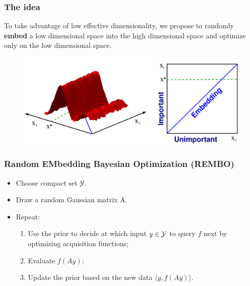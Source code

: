 \documentclass[grey]{beamer}
\begin{document}
 \begin{frame}
  \frametitle{The idea}
  To take advantage of low effective dimensionality, we propose to 
  randomly {\bf \textcolor{myColor}{embed}} 
  a low dimensional space into the high dimensional space and optimize
  only on the low dimensional space.
  \begin{figure}[t]
   \includegraphics[width = 0.9\columnwidth]
   {../paper/figures/2to1embedding}
   \label{fig:ESSL_BLR}
  \end{figure}
 \end{frame}
 
 \begin{frame}
  \frametitle{Random EMbedding Bayesian Optimization (REMBO)}
  \begin{itemize}
   \item Choose compact set {\bf \textcolor{myColor}{$\mathcal{Y}$}}.
   \item Draw a random Gaussian matrix A.
   \item Repeat:
   \begin{enumerate}
    \item Use the prior to decide at which input $y \in \cal Y$ to query $f$ next
    by optimizing acquisition functions;
    \item Evaluate {\bf \textcolor{myColor}{$f(Ay)$}};
    \item Update the prior based on the new data 
    {\bf \textcolor{myColor}{$\langle{}y, f(Ay)\rangle$}}.
   \end{enumerate}
  \end{itemize}
 \end{frame}
\end{document}
